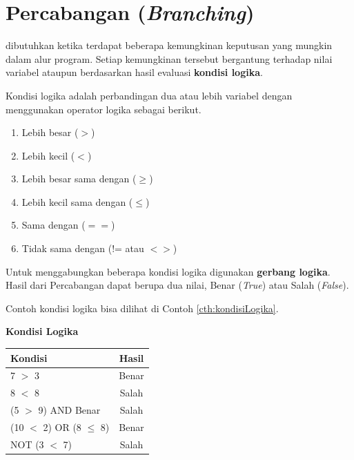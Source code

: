 \chapter{Percabangan (\textit{Branching})}
 dibutuhkan ketika terdapat beberapa kemungkinan keputusan yang mungkin dalam alur program. Setiap kemungkinan tersebut bergantung terhadap nilai variabel ataupun berdasarkan hasil evaluasi \textbf{kondisi logika}. 

Kondisi logika adalah perbandingan dua atau lebih variabel dengan menggunakan operator logika sebagai berikut.
\begin{enumerate}
	\item Lebih besar ($>$)
	\item Lebih kecil ($<$)
	\item Lebih besar sama dengan ($\geq$)
	\item Lebih kecil sama dengan ($\leq$)
	\item Sama dengan ($==$)
	\item Tidak sama dengan (!= atau $<>$)
\end{enumerate}

Untuk menggabungkan beberapa kondisi logika digunakan \textbf{gerbang logika}.\\
Hasil dari Percabangan dapat berupa dua nilai, Benar (\textit{True}) atau Salah (\textit{False}).

Contoh kondisi logika bisa dilihat di Contoh \ref{cth:kondisiLogika}.
\begin{contoh}
\label{cth:kondisiLogika}
\textbf{Kondisi Logika}\\

\begin{table}
	\centering
	\begin{tabular}{  l  c  }
	\hline
	Kondisi & Hasil \\
	\hline
	7 $>$ 3 & Benar \\
	8 $<$ 8 & Salah \\
	(5 $>$ 9) AND Benar & Salah \\
	(10 $<$ 2) OR (8 $\leq$ 8) & Benar \\
	NOT (3 $<$ 7) & Salah \\
	\hline
	\end{tabular}
\label{table:tabellogika}
\end{table}
\end{contoh}


